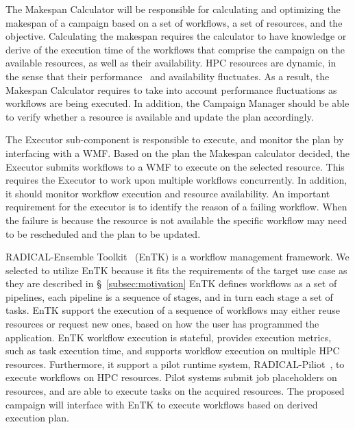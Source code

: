The Makespan Calculator will be responsible for calculating and optimizing the makespan of a campaign based on a set of workflows, a set of resources, and the objective.
Calculating the makespan requires the calculator to have knowledge or derive of the execution time of the workflows that comprise the campaign on the available resources, as well as their availability.
HPC resources are dynamic, in the sense that their performance~\cite{pouchard2019computational} and availability fluctuates.
As a result, the Makespan Calculator requires to take into account performance fluctuations as workflows are being executed.
In addition, the Campaign Manager should be able to verify whether a resource is available and update the plan accordingly.

The Executor sub-component is responsible to execute, and monitor the plan by interfacing with a WMF.
Based on the plan the Makespan calculator decided, the Executor submits workflows to a WMF to execute on the selected resource.
This requires the Executor to work upon multiple workflows concurrently.
In addition, it should monitor workflow execution and resource availability.
An important requirement for the executor is to identify the reason of a failing workflow.
When the failure is because the resource is not available the specific workflow may need to be rescheduled and the plan to be updated.

RADICAL-Ensemble Toolkit~\cite{balasubramanian2018harnessing} (EnTK) is a workflow management framework.
We selected to utilize EnTK because it fits the requirements of the target use case as they are described in \S~\ref{subsec:motivation}
EnTK defines workflows as a set of pipelines, each pipeline is a sequence of stages, and in turn each stage a set of tasks.
EnTK support the execution of a sequence of workflows may either reuse resources or request new ones, based on how the user has programmed the application.
EnTK workflow execution is stateful, provides execution metrics, such as task execution time, and supports workflow execution on multiple HPC resources.
Furthermore, it support a pilot runtime system, RADICAL-Piliot~\cite{merzky2019using}, to execute workflows on HPC resources.
Pilot systems submit job placeholders on resources, and are able to execute tasks on the acquired resources.
The proposed campaign will interface with EnTK to execute workflows based on derived execution plan.
